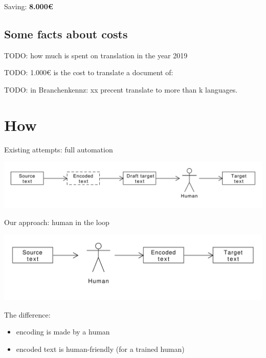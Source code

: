 \documentclass{article}
\begin{document}
Saving: \textbf{8.000€}

\subsection{Some facts about costs}
TODO: how much is spent on translation in the year 2019

TODO: 1.000€ is the cost to translate a document of: 

TODO: in Branchenkennz: xx precent translate to more than k languages.

\section{How}

Existing attempts: full automation

\includegraphics[scale=0.5]{dia/how-current-world.pdf}

Our approach: human in the loop

\includegraphics[scale=0.5]{dia/how-tokimani.pdf}

The difference:
\begin{itemize}
\item encoding is made by a human
\item encoded text is human-friendly (for a trained human)
\end{itemize}
\end{document}
